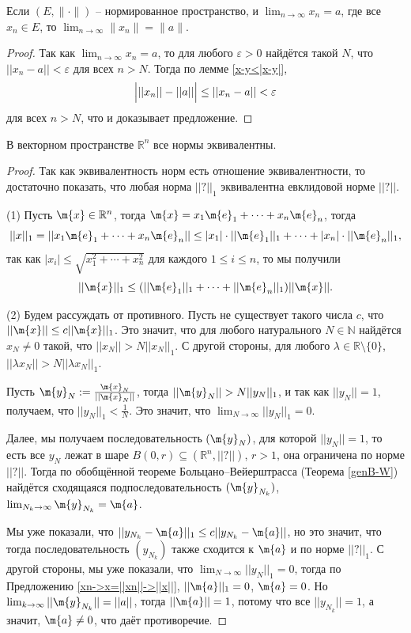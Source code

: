 \begin{proposition}\label{xn->x=||xn||->||x||}
    Если $(E, \| \cdot \|)$ -- нормированное пространство, и $\lim_{n \to \infty} x_n = a$, где все $x_n \in E$, то $\lim_{n \to \infty} \| x_n \| = \|a \|$.
\end{proposition}
\begin{proof}
    Так как $\lim_{n \to \infty} x_n = a$, то для любого $\varepsilon >0$ найдётся такой $N$, что $||x_n - a|| < \varepsilon$ для всех $n >N$. Тогда по лемме \ref{x-y<|x-y|},
    \[
     \Bigl| ||x_n|| - ||a|| \Bigr| \le ||x_n - a|| < \varepsilon
    \]
    для всех $n>N$, что и доказывает предложение.
\end{proof}


\begin{theorem}\label{all_norma_are_=}
    В векторном пространстве $\mathbb{R}^n$ все нормы эквивалентны.
\end{theorem}
\begin{proof}
Так как эквивалентность норм есть отношение эквивалентности, то достаточно показать, что любая норма $||?||_1$ эквивалентна евклидовой норме $||?||.$

(1) Пусть $\m{x} \in \mathbb{R}^n$, тогда $\m{x} = x_1 \m{e}_1 + \cdots + x_n \m{e}_n$, тогда
\[
 ||x||_1 = || x_1 \m{e}_1 + \cdots + x_n \m{e}_n || \le |x_1| \cdot ||\m{e}_1||_1 + \cdots + |x_n| \cdot ||\m{e}_n||_1,
\]
так как $|x_i| \le \sqrt{x_1^2 + \cdots + x_n^2}$ для каждого $1\le i \le n$, то мы получили
\[
 ||\m{x}||_1 \le (||\m{e}_1||_1 + \cdots + ||\m{e}_n||_1) || \m{x} ||.
\]

(2) Будем рассуждать от противного. Пусть не существует такого числа $c$, что $||\m{x}|| \le c ||\m{x}||_1$. Это значит, что для любого натурального $N \in \mathbb{N}$ найдётся $x_N \ne 0$ такой, что $||x_N|| > N ||x_N||_1$. С другой стороны, для любого $\lambda \in \mathbb{R}\setminus \{0\}$, $||\lambda x_N|| > N || \lambda x_N||_1$.

Пусть $\m{y}_N: = \frac{\m{x}_N}{||\m{x}_N||}$, тогда $||\m{y}_N|| > N ||y_N||_1$, и так как $||y_N|| = 1$, получаем, что $||y_N||_1 < \frac{1}{N}$. Это значит, что $\lim_{N \to \infty} ||y_N||_1 = 0.$

Далее, мы получаем последовательность $(\m{y}_N)$, для которой $||y_{N}|| =1$, то есть все $y_N$ лежат в шаре $B(0,r) \subseteq (\mathbb{R}^n, ||?||)$, $r>1$, \ie она ограничена по норме $||?||.$ Тогда по обобщённой теореме Больцано--Вейерштрасса (Теорема \ref{genB-W}) найдётся сходящаяся подпоследовательность $(\m{y}_{N_k})$, $\lim_{N_k \to \infty} \m{y}_{N_k} = \m{a}$.

Мы уже показали, что $||y_{N_k} - \m{a}||_1 \le c || y_{N_k} - \m{a}||$, но это значит, что тогда последовательность $(y_{N_k})$ также сходится к $\m{a}$ и по норме $||?||_1.$ С другой стороны, мы уже показали, что $\lim_{N \to \infty} ||y_N||_1 = 0$, тогда по Предложению \ref{xn->x=||xn||->||x||}, $||\m{a}||_1 = 0$, \ie $\m{a} = 0$. Но $\lim_{k \to \infty} ||\m{y}_{N_k}|| = ||a||$, тогда $||\m{a}|| = 1$, потому что все $||y_{N_k}|| = 1$, а значит, $\m{a} \ne 0$, что даёт противоречие.
\end{proof}


